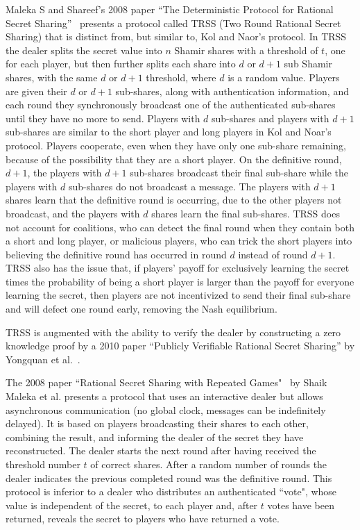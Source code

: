 \documentclass[12pt]{dalcsthesis}
\begin{document}
Maleka S and Shareef's 2008 paper ``The Deterministic Protocol for Rational Secret Sharing''~\cite{MalekaS_08} presents a protocol called TRSS (Two Round Rational Secret Sharing) that is distinct from, but similar to, Kol and Naor's protocol. In TRSS the dealer splits the secret value into $n$ Shamir shares with a threshold of $t$, one for each player, but then further splits each share into $d$ or $d+1$ sub Shamir shares, with the same $d$ or $d+1$ threshold, where $d$ is a random value. Players are given their $d$ or $d+1$ sub-shares, along with authentication information, and each round they synchronously broadcast one of the authenticated sub-shares until they have no more to send. Players with $d$ sub-shares and players with $d+1$ sub-shares are similar to the short player and long players in Kol and Noar's protocol. Players cooperate, even when they have only one sub-share remaining, because of the possibility that they are a short player. On the definitive round, $d+1$, the players with $d+1$ sub-shares broadcast their final sub-share while the players with $d$ sub-shares do not broadcast a message. The players with $d+1$ shares learn that the definitive round is occurring, due to the other players not broadcast, and the players with $d$ shares learn the final sub-shares. TRSS does not account for coalitions, who can detect the final round when they contain both a short and long player, or malicious players, who can trick the short players into believing the definitive round has occurred in round $d$ instead of round $d+1$. TRSS also has the issue that, if players' payoff for exclusively learning the secret times the probability of being a short player is larger than the payoff for everyone learning the secret, then players are not incentivized to send their final sub-share and will defect one round early, removing the Nash equilibrium.

TRSS is augmented with the ability to verify the dealer by constructing a zero knowledge proof by a 2010 paper ``Publicly Verifiable Rational Secret Sharing'' by Yongquan et al.~\cite{yongquan10}.

The 2008 paper ``Rational Secret Sharing with Repeated Games"~\cite{maleka08} by Shaik Maleka et al. presents a protocol that uses an interactive dealer but allows asynchronous communication (no global clock, messages can be indefinitely delayed). It is based on players broadcasting their shares to each other, combining the result, and informing the dealer of the secret they have reconstructed. The dealer starts the next round after having received the threshold number $t$ of correct shares. After a random number of rounds the dealer indicates the previous completed round was the definitive round. This protocol is inferior to a dealer who distributes an authenticated ``vote", whose value is independent of the secret, to each player and, after $t$ votes have been returned, reveals the secret to players who have returned a vote. 
\end{document}
